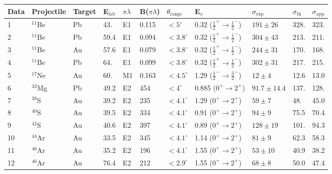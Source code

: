 \documentclass[prc,preprint,showpacs,showkeys,nofootinbib]{revtex4}%
\begin{document}
\begin{tabular}
[c]{|l|l|l|l|l|l|l|l|l|l|l|}\hline
Data & Projectile & Target & E$_{\text{lab}}$ & $\pi\lambda$ & B($\pi\lambda
$) & $\theta_{\text{range}}$ & E$_{x}$ & $\sigma_{\exp}$ & $\sigma_{\text{th}%
}$ & $\sigma_{\text{app}}$\\\hline\hline 1 \cite{Ann95} & $^{11}$Be
& Pb & 43. & E1 & 0.115 & $<5^{\circ}$ & 0.32
($\frac{1}{2}^{+}\rightarrow\frac{1}{2}^{-}$) & $191\pm26$ & 328. &
323.\\\hline 2 \cite{Ann95} & $^{11}$Be & Pb & 59.4 & E1 & 0.094 &
$<3.8^{\circ}$ & 0.32 ($\frac{1}{2}^{+}\rightarrow\frac{1}{2}^{-}$)
& $304\pm43$ & 213. & 211.\\\hline 3  \cite{Fau97} & $^{11}$Be & Au
& 57.6 & E1 & 0.079 & $<3.8^{\circ}$ & 0.32
($\frac{1}{2}^{+}\rightarrow\frac{1}{2}^{-}$) & $244\pm31$ & 170. &
168.\\\hline 4 \cite{Nak97} & $^{11}$Be & Pb & 64. & E1 & 0.099 &
$<3.8^{\circ}$ & 0.32 ($\frac{1}{2}^{+}\rightarrow\frac{1}{2}^{-}$)
& $302\pm31$ & 217. & 215.\\\hline 5 \cite{Ch97,Ch02} & $^{17}$Ne &
Au & 60. & M1 & 0.163 & $<4.5^{\circ}$ & 1.29
($\frac{1}{2}^{-}\rightarrow\frac{3}{2}^{-}$) & $12\pm4$ & 12.6 &
13.0\\\hline 6 \cite{Mot95} & $^{32}$Mg & Pb & 49.2 & E2 & 454 &
$<4^{\circ}$ & 0.885 ($0^{+}\rightarrow2^{+}$) & $91.7\pm14.4$ &
137. & 128.\\\hline 7 \cite{Ch97} & $^{38}$S & Au & 39.2 & E2 & 235
& $<4.1^{\circ}$ & 1.29 ($0^{+}\rightarrow2^{+}$) & $59\pm7$ & 48. &
45.0\\\hline 8 \cite{Ch97} & $^{40}$S & Au & 39.5 & E2 & 334 &
$<4.1^{\circ}$ & 0.91 ($0^{+}\rightarrow2^{+}$) & $94\pm9$ & 75.5 &
70.4\\\hline 9 \cite{Ch97} & $^{42}$S & Au & 40.6 & E2 & 397 &
$<4.1^{\circ}$ & 0.89 ($0^{+}\rightarrow2^{+}$) & $128\pm19$ & 101.
& 94.3\\\hline 10 \cite{Ch97} & $^{44}$Ar & Au & 33.5 & E2 & 345 &
$<4.1^{\circ}$ & 1.14 ($0^{+}\rightarrow2^{+}$) & $81\pm9$ & 62.3 &
58.3\\\hline 11 \cite{Ch97} & $^{46}$Ar & Au & 35.2 & E2 & 196 &
$<4.1^{\circ}$ & 1.55 ($0^{+}\rightarrow2^{+}$) & $53\pm10$ & 40.9 &
38.2\\\hline 12 \cite{Gad03} & $^{46}$Ar & Au & 76.4 & E2 & 212 &
$<2.9^{\circ}$ & 1.55 ($0^{+}\rightarrow2^{+}$) & $68\pm8$ & 50.0 &
47.4\\\hline
\end{tabular}
\end{document}
